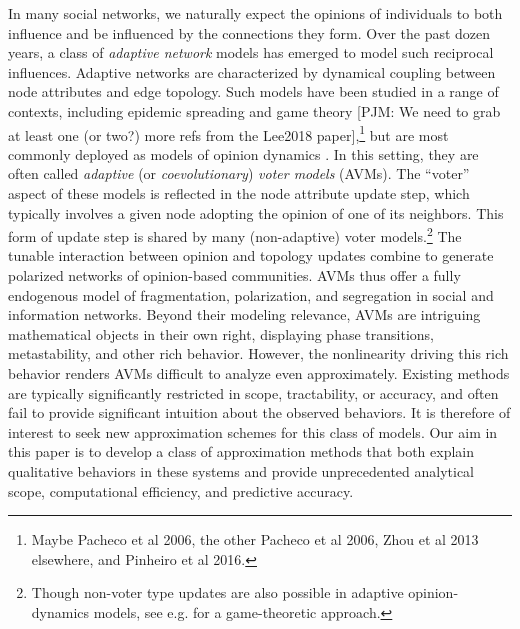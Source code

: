 \documentclass[review, onefignum, onetabnum]{siamart171218}
\newcommand{\pjm}[1]{{\color{blue}[PJM: #1]}}
\begin{document}
    In many social networks, we naturally expect the opinions of individuals to both influence and be influenced by the connections they form. 
	Over the past dozen years, a class of \emph{adaptive network} models has emerged to model such reciprocal influences. 
	Adaptive networks \cite{Gross2008,Gross2009} are characterized by dynamical coupling between node attributes and edge topology.
	Such models have been studied in a range of contexts, including epidemic spreading \cite{Gross2006,Marceau2010,Gross2017,Lee2017,Horstmeyer2018} and game theory \cite{Lee2018} \pjm{We need to grab at least one (or two?) more refs from the Lee2018 paper},\footnote{Maybe Pacheco et al 2006, the other Pacheco et al 2006, Zhou et al 2013 elsewhere, and Pinheiro et al 2016.} but are most commonly deployed as models of opinion dynamics \cite{Holme2006,Durrett2012,Gross2012,Gross2014,Malik2016,Shi2013}. 
	In this setting, they are often called \emph{adaptive} (or \emph{coevolutionary}) \emph{voter models} (AVMs). 
	The ``voter'' aspect of these models is reflected in the node attribute update step, which typically involves a given node adopting the opinion of one of its neighbors. 
	This form of update step is shared by many (non-adaptive) voter models.\footnote{Though non-voter type updates are also possible in adaptive opinion-dynamics models, see e.g. \cite{Bhawalkar2013a} for a game-theoretic approach.} 
	The tunable interaction between opinion and topology updates combine to generate polarized networks of opinion-based communities. 
	AVMs thus offer a fully endogenous model of fragmentation, polarization, and segregation in social and information networks. 
	Beyond their modeling relevance, AVMs are intriguing mathematical objects in their own right, displaying phase transitions, metastability, and other rich behavior. 
	However, the nonlinearity driving this rich behavior renders AVMs difficult to analyze even approximately. 
	Existing methods are typically significantly restricted in scope, tractability, or accuracy, and often fail to provide significant intuition about the observed behaviors. 
	It is therefore of interest to seek new approximation schemes for this class of models. 
	Our aim in this paper is to develop a class of approximation methods that both explain qualitative behaviors in these systems and provide unprecedented analytical scope, computational efficiency, and predictive accuracy. 
\end{document}
